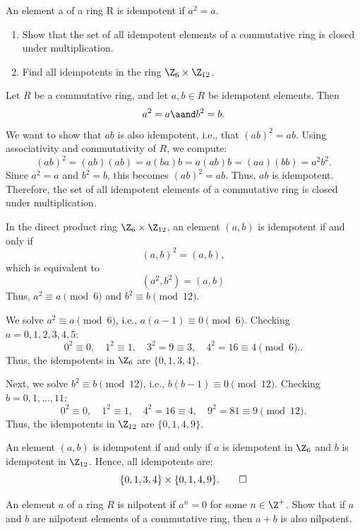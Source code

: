 \begin{problem}[22.46]
  An element a of a ring R is idempotent if $a^2 = a$.
  \begin{enumerate}
    \item Show that the set of all idempotent elements of a commutative ring is closed under multiplication.
    \item Find all idempotents in the ring $\Z_6 \times \Z_{12}$.
  \end{enumerate}
\end{problem}

\begin{solution}[(i)]
  Let $R$ be a commutative ring, and let $a,b \in R$ be idempotent elements. Then
  \[%
    a^2 = a \aand b^2 = b
  .\]%
  We want to show that $ab$ is also idempotent, i.e., that $(ab)^2 = ab$. Using associativity and commutativity of $R$, we compute:
  \[%
    (ab)^2 = (ab)(ab) = a(ba)b = a(ab)b = (aa)(bb) = a^2 b^2
  .\]%
  Since $a^2 = a$ and $b^2 = b$, this becomes $(ab)^2 = ab$. Thus, $ab$ is idempotent. Therefore, the set of all idempotent elements of a commutative ring is closed under multiplication.
\end{solution}

\begin{solution}[(ii)]
  In the direct product ring $\Z_6 \times \Z_{12}$, an element $(a,b)$ is idempotent if and only if
  \[%
    (a,b)^2 = (a,b)
  ,\]%
  which is equivalent to
  \[%
    (a^2, b^2) = (a,b)
  \]%
  Thus, $a^2 \equiv a \pmod{6}$ and $b^2 \equiv b \pmod{12}$.

  We solve $a^2 \equiv a \pmod{6}$, i.e., $a(a-1) \equiv 0 \pmod{6}$. Checking $a = 0, 1, 2, 3, 4, 5$:
  \[%
    0^2 \equiv 0,\quad 1^2 \equiv 1,\quad 3^2 = 9 \equiv 3,\quad 4^2 = 16 \equiv 4 \pmod{6}.
  .\]%
  Thus, the idempotents in $\Z_6$ are $\{0, 1, 3, 4\}$.

  Next, we solve $b^2 \equiv b \pmod{12}$, i.e., $b(b-1) \equiv 0 \pmod{12}$. Checking $b = 0, 1, \dots, 11$:
  \[%
    0^2 \equiv 0,\quad 1^2 \equiv 1,\quad 4^2 = 16 \equiv 4,\quad 9^2 = 81 \equiv 9 \pmod{12}
  .\]%
  Thus, the idempotents in $\Z_{12}$ are $\{0,1,4,9\}$.

  An element $(a, b)$ is idempotent if and only if $a$ is idempotent in $\Z_6$ and $b$ is idempotent in $\Z_{12}$. Hence, all idempotents are:
  \[%
    \{0,1,3,4\} \times \{0,1,4,9\}
  .\qedhere\]%
\end{solution}

\begin{problem}[22.48]
  An element $a$ of a ring $R$ is nilpotent if $a^n = 0$ for some $n \in \Z^+$. Show that if $a$ and $b$ are nilpotent elements of a commutative ring, then $a + b$ is also nilpotent.
\end{problem}

